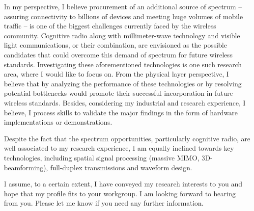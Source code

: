 \documentclass[11pt,a4paper,sans]{moderncv}        %
\begin{document}
In my perspective, I believe procurement of an additional source of spectrum -- assuring connectivity to billions of devices and meeting huge volumes of mobile traffic -- is one of the biggest challenges currently faced by the wireless community. Cognitive radio along with millimeter-wave technology and visible light communications, or their combination, are envisioned as the possible candidates that could overcome this demand of spectrum for future wireless standards. Investigating these aforementioned technologies is one such research area, where I would like to focus on. From the physical layer perspective, I believe that by analyzing the performance of these technologies or by resolving potential bottlenecks would promote their successful incorporation in future wireless standards. Besides, considering my industrial and research experience, I believe, I process skills to validate the major findings in the form of hardware implementations or demonstrations. %

Despite the fact that the spectrum opportunities, particularly cognitive radio, are well associated to my research experience, I am equally inclined towards key technologies, including spatial signal processing (massive MIMO, 3D-beamforming), full-duplex transmissions and waveform design. 

I assume, to a certain extent, I have conveyed my research interests to you and hope that my profile fits to your workgroup. I am looking forward to hearing from you. Please let me know if you need any further information. 


\makeletterclosing
\end{document}
